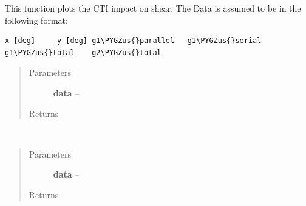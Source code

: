 \documentclass[a4paper,11pt,english]{sphinxmanual}
\def\PYGZus{\char`\_}
\begin{document}

\begin{fulllineitems}
\label{analysis:analysis.CTIpower.plotCTIeffect}
This function plots the CTI impact on shear. The Data is assumed to be in the following format:

\begin{Verbatim}[commandchars=\\\{\}]
x [deg]     y [deg] g1\PYGZus{}parallel   g1\PYGZus{}serial    g1\PYGZus{}total    g2\PYGZus{}total
\end{Verbatim}
\begin{quote}\begin{description}
\item[{Parameters}] \leavevmode
\textbf{data} -- 

\item[{Returns}] \leavevmode


\end{description}\end{quote}

\end{fulllineitems}


\begin{fulllineitems}
\label{analysis:analysis.CTIpower.plotPower}~\begin{quote}\begin{description}
\item[{Parameters}] \leavevmode
\textbf{data} -- 

\item[{Returns}] \leavevmode


\end{description}\end{quote}

\end{fulllineitems}

\end{document}
